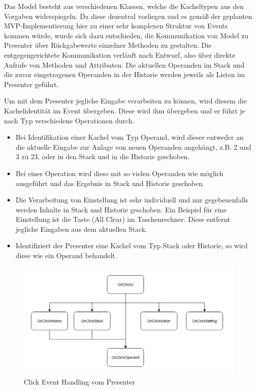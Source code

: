 Das Model besteht aus verschiedenen Klassen, welche die Kacheltypen aus den Vorgaben widerspiegeln. Da diese dezentral vorliegen und es gemäß der geplanten MVP-Implementierung hier zu einer sehr komplexen Struktur von Events kommen würde, wurde sich dazu entschieden, die Kommunikation von Model zu Presenter über Rückgabewerte einzelner Methoden zu gestalten. Die entgegengerichtete Kommunikation verläuft nach Entwurf, also über direkte Aufrufe von Methoden und Attributen. Die aktuellen Operanden im Stack und die zuvor eingetragenen Operanden in der Historie werden jeweils als Listen im Presenter geführt.

Um mit dem Presenter jegliche Eingabe verarbeiten zu können, wird diesem die Kachelidentität im Event übergeben. Diese wird ihm übergeben und er führt je nach Typ verschiedene Operationen durch.

\begin{itemize}
\item Bei Identifikation einer Kachel vom Typ Operand, wird dieser entweder an die aktuelle Eingabe zur Anlage von neuen Operanden angehängt, z.B. 2 und 3 zu 23, oder in den Stack und in die Historie geschoben. 
\item Bei einer Operation wird diese mit so vielen Operanden wie möglich ausgeführt und das Ergebnis in Stack und Historie geschoben.
\item Die Verarbeitung von Einstellung ist sehr individuell und nur gegebenenfalls werden Inhalte in Stack und Historie geschoben. Ein Beispiel für eine Einstellung ist die Taste  (All Clear) im Taschenrechner. Diese entfernt jegliche Eingaben aus dem aktuellen Stack.
\item Identifiziert der Presenter eine Kachel vom Typ Stack oder Historie, so wird diese wie ein Operand behandelt.
\end{itemize}


\begin{figure}[!h]
	\includegraphics[width=1\columnwidth]{img/click-event-handling-vom-presenter}
	\caption[Click Event Handling vom Presenter]{Click Event Handling vom Presenter\footnotemark}
\end{figure}

